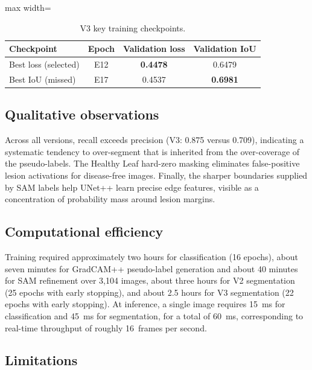 \documentclass[final,5p,times,twocolumn,authoryear]{elsarticle}
\begin{document}
\begin{table}[!htbp]
\centering
\caption{V3 key training checkpoints.}
\label{tab:v3_dynamics}
\begin{adjustbox}{max width=\columnwidth}
\begin{tabular}{lccc}
\toprule
\textbf{Checkpoint} & \textbf{Epoch} & \textbf{Validation loss} & \textbf{Validation IoU} \\
\midrule
Best loss (selected) & E12 & \textbf{0.4478} & 0.6479 \\
Best IoU (missed)    & E17 & 0.4537           & \textbf{0.6981} \\
\bottomrule
\end{tabular}
\end{adjustbox}
\end{table}

\subsection{Qualitative observations}

Across all versions, recall exceeds precision (V3: 0.875 versus 0.709), indicating a systematic tendency to over-segment that is inherited from the over-coverage of the pseudo-labels. The Healthy Leaf hard-zero masking eliminates false-positive lesion activations for disease-free images. Finally, the sharper boundaries supplied by SAM labels help UNet++ learn precise edge features, visible as a concentration of probability mass around lesion margins.

\subsection{Computational efficiency}

Training required approximately two hours for classification (16 epochs), about seven minutes for GradCAM++ pseudo-label generation and about 40 minutes for SAM refinement over 3{,}104 images, about three hours for V2 segmentation (25 epochs with early stopping), and about 2.5 hours for V3 segmentation (22 epochs with early stopping). At inference, a single image requires 15~ms for classification and 45~ms for segmentation, for a total of 60~ms, corresponding to real-time throughput of roughly 16~frames per second.

\subsection{Limitations}
\label{sec:limitations}
\end{document}
